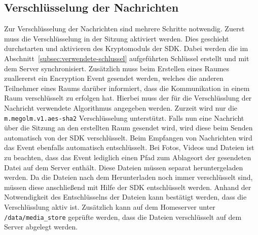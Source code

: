     \subsection{Verschlüsselung der Nachrichten}\label{subsec:verschlusselung-der-nachrichten}
    Zur Verschlüsselung der Nachrichten sind mehrere Schritte notwendig.
    Zuerst muss die Verschlüsselung in der Sitzung aktiviert werden.
    Dies geschieht durchstarten und aktivieren des Kryptomoduls der SDK.
    Dabei werden die im Abschnitt~\ref{subsec:verwendete-schlussel} aufgeführten Schlüssel erstellt und mit dem Server synchronisiert.
    Zusätzlich muss beim Erstellen eines Raumes zuallererst ein Encryption Event gesendet werden, welches die anderen Teilnehmer eines Raums darüber informiert, dass die Kommunikation in einem Raum verschlüsselt zu erfolgen hat.
    Hierbei muss der für die Verschlüsslung der Nachricht verwendete Algorithmus angegeben werden.
    Zurzeit wird nur die \texttt{m.megolm.v1.aes-sha2} Verschlüsselung unterstützt.
    Falls nun eine Nachricht über die Sitzung an den erstellten Raum gesendet wird, wird diese beim Senden automatisch von der SDK verschlüsselt.
    Beim Empfangen von Nachrichten wird das Event ebenfalls automatisch entschlüsselt.
    Bei Fotos, Videos und Dateien ist zu beachten, dass das Event lediglich einen Pfad zum Ablageort der gesendeten Datei auf dem Server enthält.
    Diese Dateien müssen separat heruntergeladen werden.
    Da die Dateien nach dem Herunterladen noch immer verschlüsselt sind, müssen diese anschließend mit Hilfe der SDK entschlüsselt werden.
    Anhand der Notwendigkeit des Entschlüsselns der Dateien kann bestätigt werden, dass die Verschlüsslung aktiv ist.
    Zusätzlich kann auf dem Homeserver unter \texttt{/data/media\_store} geprüfte werden, dass die Dateien verschlüsselt auf dem Server abgelegt werden.


